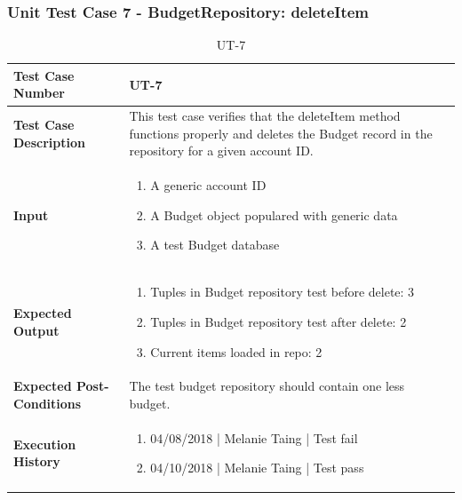 \documentclass[12pt]{article}
\begin{document}
\subsubsection{Unit Test Case 7 - BudgetRepository: deleteItem}
\def\arraystretch{1.5}%
\begin{table}[htbp]
\centering
\caption {UT-7}
\label{UT-7}
\begin{tabularx}{\textwidth}{ | l | X |}
\hline
\textbf{Test Case Number}      &  UT-7                         \\ \hline
\textbf{Test Case Description}    &  This test case verifies that the deleteItem method functions properly and deletes the Budget record in the repository for a given account ID.         \\ \hline
\textbf{Input}         & 	\begin{enumerate}
	\item A generic account ID
	\item A Budget object populared with generic data
	\item A test Budget database
\end{enumerate} \\ \hline

\textbf{Expected Output}     & 
	\begin{enumerate}
		\item Tuples in Budget repository test before delete: 3
		\item Tuples in Budget repository test after delete: 2
		\item Current items loaded in repo: 2
	\end{enumerate} \\ \hline
\textbf{Expected Post-Conditions}           & The test budget repository should contain one less budget.            \\ \hline
\textbf{Execution History}   &  \begin{enumerate}
	\item 04/08/2018 | Melanie Taing | Test fail
	\item 04/10/2018 | Melanie Taing | Test pass
\end {enumerate} \\ \hline
\end{tabularx}
\end{table}
\clearpage


\end{document}
